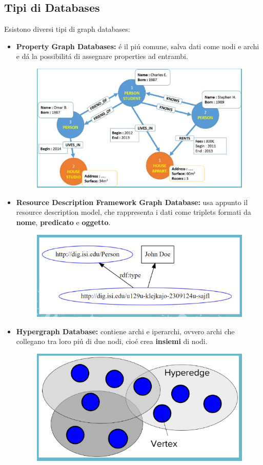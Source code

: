 \subsection{Tipi di Databases}
Esistono diversi tipi di graph databases:
\begin{itemize}
    \item \textbf{Property Graph Databases:} é il piú comune, salva dati come nodi e archi e dá la possibilitá di assegnare properties ad entrambi. 
    \begin{figure}[th]
        \centering
        \includegraphics[width=0.5\linewidth]{GraphDatabase//img/propertygraphdb.png}
    \end{figure}
    \item \textbf{Resource Description Framework Graph Database:} usa appunto il resource description model, che rappresenta i dati come triplets formati da \textbf{nome}, \textbf{predicato} e \textbf{oggetto}.
    \begin{figure}[th]
        \centering
        \includegraphics[width=0.5\linewidth]{GraphDatabase//img/RDF.png}
    \end{figure}
    \item \textbf{Hypergraph Database:} contiene archi e iperarchi, ovvero archi che collegano tra loro piú di due nodi, cioé crea \textbf{insiemi} di nodi.
    \begin{figure}[th]
        \centering
        \includegraphics[width=0.5\linewidth]{GraphDatabase//img/hyperedge.png}

\end{figure}
\end{itemize}
